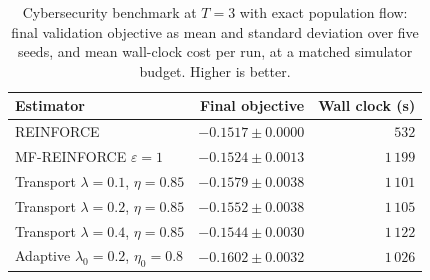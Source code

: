 \begin{table}[H]
\centering
\begin{tabular}{lrr}
\toprule
Estimator & Final objective & Wall clock (s) \\
\midrule
REINFORCE & $\mathbf{-0.1517\pm0.0000}$ & $532$ \\
MF-REINFORCE $\varepsilon=1$ & $-0.1524\pm0.0013$ & $1\,199$ \\
Transport $\lambda=0.1$, $\eta=0.85$ & $-0.1579\pm0.0038$ & $1\,101$ \\
Transport $\lambda=0.2$, $\eta=0.85$ & $-0.1552\pm0.0038$ & $1\,105$ \\
Transport $\lambda=0.4$, $\eta=0.85$ & $-0.1544\pm0.0030$ & $1\,122$ \\
Adaptive $\lambda_0=0.2$, $\eta_0=0.8$ & $-0.1602\pm0.0032$ & $1\,026$ \\
\bottomrule
\end{tabular}
\caption{Cybersecurity benchmark at $T=3$ with exact population flow: final validation objective as mean and standard deviation over five seeds, and mean wall-clock cost per run, at a matched simulator budget. Higher is better.}
\label{tab:summary-cybersecurity}
\end{table}
